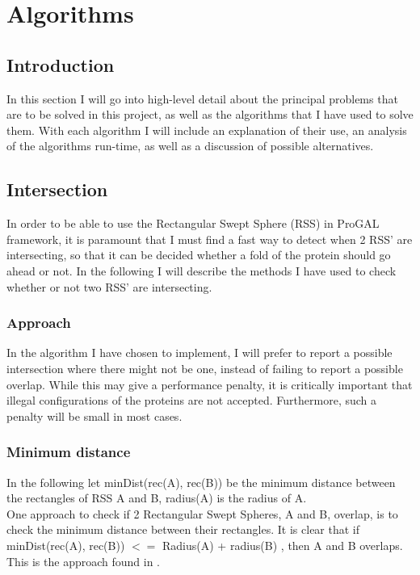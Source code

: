 
\section{Algorithms}
\label{algorithms}
\subsection{Introduction}
In this section I will go into high-level detail about the principal problems that are to be solved in this project, as well as the algorithms that I have used to solve them. With each algorithm I will include an explanation of their use, an analysis of the algorithms run-time, as well as a discussion of possible alternatives. 

\subsection{Intersection}
In order to be able to use the Rectangular Swept Sphere (RSS) in ProGAL framework, it is paramount that I must find a fast way to detect when 2 RSS' are intersecting, so that it can be decided whether a fold of the protein should go ahead or not. In the following I will describe the methods I have used to check whether or not two RSS' are intersecting.

\subsubsection{Approach}
In the algorithm I have chosen to implement, I will prefer to report a possible intersection where there might not be one, instead of failing to report a possible overlap. While this may give a performance penalty, it is critically important that illegal configurations of the proteins are not accepted. Furthermore, such a penalty will be small in most cases.

\subsubsection{Minimum distance}
In the following let minDist(rec(A), rec(B)) be the minimum distance between the rectangles of RSS A and B, radius(A) is the radius of A.\\

One approach to check if 2 Rectangular Swept Spheres, A and B, overlap, is to check the minimum distance between their rectangles. It is clear that if minDist(rec(A), rec(B)) $<=$ Radius(A) + radius(B) , then A and B overlaps. This is the approach found in \cite{Larsen99fastproximity}.

